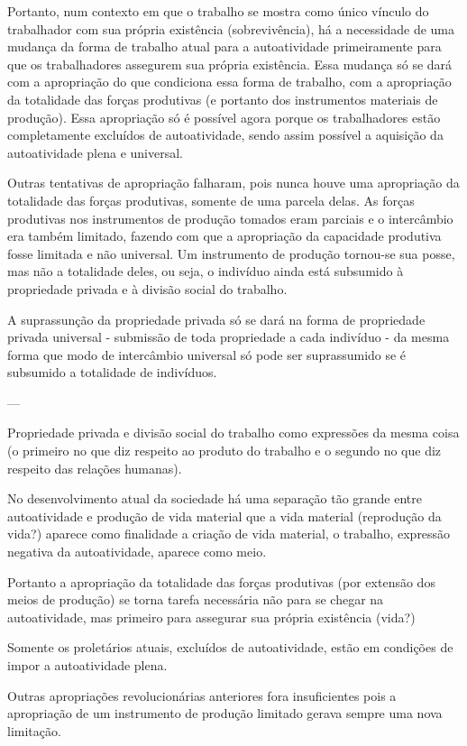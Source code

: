 \documentclass[12pt]{article}
\begin{document}
Portanto, num contexto em que o trabalho se mostra como único vínculo do trabalhador com sua própria existência (sobrevivência), há a necessidade de uma mudança da forma de trabalho atual para a autoatividade primeiramente para que os trabalhadores assegurem sua própria existência.
Essa mudança só se dará com a apropriação do que condiciona essa forma de trabalho, com a apropriação da totalidade das forças produtivas (e portanto dos instrumentos materiais de produção).
Essa apropriação só é possível agora porque os trabalhadores estão completamente excluídos de autoatividade, sendo assim possível a aquisição da autoatividade plena e universal.

Outras tentativas de apropriação falharam, pois nunca houve uma apropriação da totalidade das forças produtivas, somente de uma parcela delas.
As forças produtivas nos instrumentos de produção tomados eram parciais e o intercâmbio era também limitado, fazendo com que a apropriação da capacidade produtiva fosse limitada e não universal. Um instrumento de produção tornou-se sua posse, mas não a totalidade deles, ou seja, o indivíduo ainda está subsumido à propriedade privada e à divisão social do trabalho.

A suprassunção da propriedade privada só se dará na forma de propriedade privada universal - submissão de toda propriedade a cada indivíduo - da mesma forma que modo de intercâmbio universal só pode ser suprassumido se é subsumido a totalidade de indivíduos.

--- 

Propriedade privada e divisão social do trabalho como expressões da mesma coisa (o primeiro no que diz respeito ao produto do trabalho e o segundo no que diz respeito das relações humanas).

No desenvolvimento atual da sociedade há uma separação tão grande entre autoatividade e produção de vida material que a vida material (reprodução da vida?) aparece como finalidade a criação de vida material, o trabalho, expressão negativa da autoatividade, aparece como meio.

Portanto a apropriação da totalidade das forças produtivas (por extensão dos meios de produção) se torna tarefa necessária não para se chegar na autoatividade, mas primeiro para assegurar sua própria existência (vida?)

Somente os proletários atuais, excluídos de autoatividade, estão em condições de impor a autoatividade plena.

Outras apropriações revolucionárias anteriores fora insuficientes pois a apropriação de um instrumento de produção limitado gerava sempre uma nova limitação.
\end{document}
